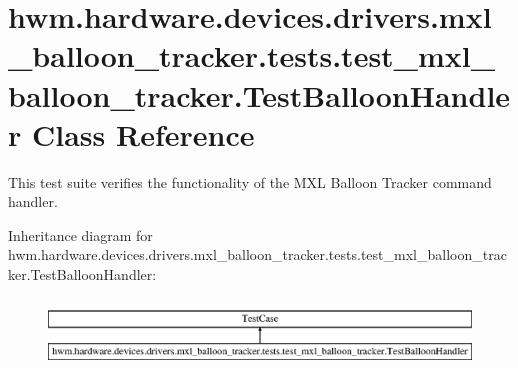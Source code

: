 \hypertarget{classhwm_1_1hardware_1_1devices_1_1drivers_1_1mxl__balloon__tracker_1_1tests_1_1test__mxl__ballo580f1655922408baf8d87971eb9118f3}{\section{hwm.\-hardware.\-devices.\-drivers.\-mxl\-\_\-balloon\-\_\-tracker.\-tests.\-test\-\_\-mxl\-\_\-balloon\-\_\-tracker.\-Test\-Balloon\-Handler Class Reference}
\label{classhwm_1_1hardware_1_1devices_1_1drivers_1_1mxl__balloon__tracker_1_1tests_1_1test__mxl__ballo580f1655922408baf8d87971eb9118f3}
}


This test suite verifies the functionality of the M\-X\-L Balloon Tracker command handler.  


Inheritance diagram for hwm.\-hardware.\-devices.\-drivers.\-mxl\-\_\-balloon\-\_\-tracker.\-tests.\-test\-\_\-mxl\-\_\-balloon\-\_\-tracker.\-Test\-Balloon\-Handler\-:\begin{figure}[H]
\begin{center}
\leavevmode
\includegraphics[height=1.872910cm]{classhwm_1_1hardware_1_1devices_1_1drivers_1_1mxl__balloon__tracker_1_1tests_1_1test__mxl__ballo580f1655922408baf8d87971eb9118f3}
\end{center}
\end{figure}
